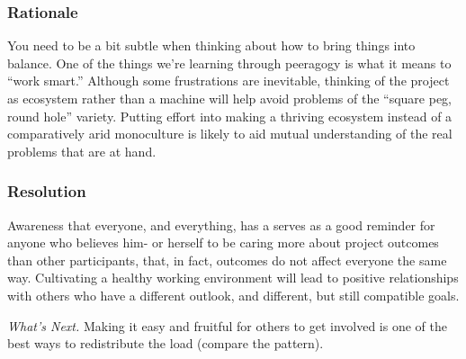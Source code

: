 \subsubsection*{Rationale} You need to be a bit subtle when thinking about how to bring
things into balance.  One of the things we're learning through
peeragogy is what it means to ``work smart.''  Although some frustrations
are inevitable, thinking of the project as ecosystem rather than a
machine will help avoid problems of the ``square peg, round hole''
variety.  Putting effort into making a thriving ecosystem instead of
a comparatively arid monoculture is likely to aid mutual understanding of
the real problems that are at hand.

\subsubsection*{Resolution}
Awareness that everyone, and everything, has a  serves as a good reminder for anyone who believes him- or
herself to be caring more about project outcomes than other
participants, that, in fact, outcomes do not affect everyone the same way.
Cultivating a healthy working environment will lead to positive relationships
with others who have a different outlook, and different, but still compatible goals.

\begin{framed}
\emph{What's Next.}
Making it easy
and fruitful for others to get involved is one of the best ways to
redistribute the load (compare the
pattern).
\end{framed}
\endgroup

    
    
    

    
    
    
    
    
    
    
    